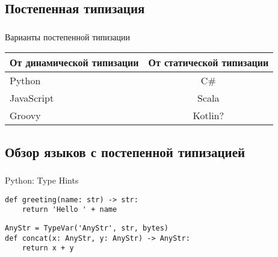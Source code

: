 \documentclass[t]{beamer}  %
\begin{document}
\subsection{Постепенная типизация}

\begin{frame}[fragile]
	\frametitle{\insertsection} 
    \framesubtitle{\insertsubsection}
	\begin{block}{Варианты постепенной типизации}
		\begin{table}
			\begin{tabular}{l | c  }
				От динамической типизации & От статической типизации \\
				\hline \hline
				Python & C\# \\ 
				JavaScript & Scala\\
				Groovy &  Kotlin?  
			\end{tabular}
		\end{table}
    \end{block}
\end{frame}


\subsection{Обзор языков с постепенной типизацией}

\begin{frame}[fragile]
	\frametitle{\insertsection} 
    \framesubtitle{\insertsubsection}
	\begin{block}{Python: Type Hints}
 	\begin{verbatim}
def greeting(name: str) -> str:
    return 'Hello ' + name
 	\end{verbatim}
     \begin{verbatim}
AnyStr = TypeVar('AnyStr', str, bytes)
def concat(x: AnyStr, y: AnyStr) -> AnyStr:
    return x + y
	\end{verbatim}
    \end{block}
\end{frame}



\end{document}
